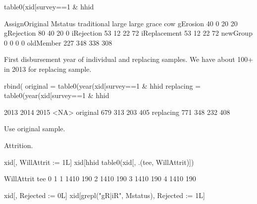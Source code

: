 \begin{Schunk}
\begin{Sinput}
table0(xid[survey==1 & hhid %in% hhidor, .(Mstatus, AssignOriginal)])
\end{Sinput}
\begin{Soutput}
              AssignOriginal
Mstatus        traditional large large grace cow
  gErosion              40     0          20  20
  gRejection            80    40          20   0
  iRejection            53    12          22  72
  iReplacement          53    12          22  72
  newGroup               0     0           0   0
  oldMember            227   348         338 308
\end{Soutput}
\end{Schunk}
First disbursement year of individual and replacing samples. We have about 100+ in 2013 for replacing sample.
\begin{Schunk}
\begin{Sinput}
rbind(
  original = table0(year(xid[survey==1 & hhid %in% hhido, DistDate1])),
  replacing = table0(year(xid[survey==1 & hhid %in% hhidor, DistDate1])))
\end{Sinput}
\begin{Soutput}
          2013 2014 2015 <NA>
original   679  313  203  405
replacing  771  348  232  408
\end{Soutput}
\end{Schunk}
Use original sample. \gobblepars
\begin{Schunk}
\end{Schunk}
Attrition. %
\begin{Schunk}
\begin{Sinput}
xid[, WillAttrit := 1L]
xid[hhid %in% hhid[AttritIn>4L], WillAttrit := 0L]
table0(xid[, .(tee, WillAttrit)])
\end{Sinput}
\begin{Soutput}
   WillAttrit
tee    0    1
  1 1410  190
  2 1410  190
  3 1410  190
  4 1410  190
\end{Soutput}
\begin{Sinput}
xid[, Rejected := 0L]
xid[grepl("gR|iR", Mstatus), Rejected := 1L]
\end{Sinput}
\end{Schunk}

